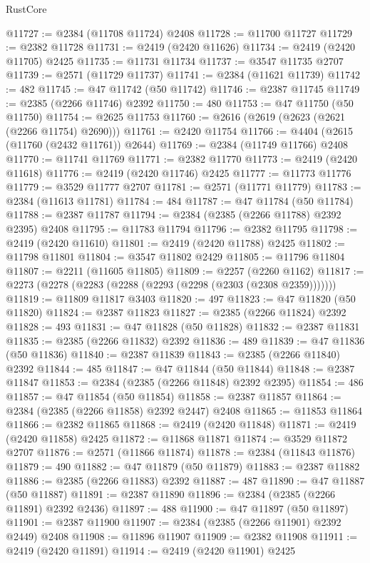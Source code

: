 \begin{lexlean}{RustCore}
\begin{coremodule}
@11727 := @2384 (@11708 @11724) @2408
@11728 := @11700 @11727
@11729 := @2382 @11728
@11731 := @2419 (@2420 @11626)
@11734 := @2419 (@2420 @11705) @2425
@11735 := @11731 @11734
@11737 := @3547 @11735 @2707
@11739 := @2571 (@11729 @11737)
@11741 := @2384 (@11621 @11739)
@11742 := 482
@11745 := @47 @11742 (@50 @11742)
@11746 := @2387 @11745
@11749 := @2385 (@2266 @11746) @2392
@11750 := 480
@11753 := @47 @11750 (@50 @11750)
@11754 := @2625 @11753
@11760 := @2616 (@2619 (@2623 (@2621 (@2266 @11754) @2690)))
@11761 := @2420 @11754
@11766 := @4404 (@2615 (@11760 (@2432 @11761)) @2644)
@11769 := @2384 (@11749 @11766) @2408
@11770 := @11741 @11769
@11771 := @2382 @11770
@11773 := @2419 (@2420 @11618)
@11776 := @2419 (@2420 @11746) @2425
@11777 := @11773 @11776
@11779 := @3529 @11777 @2707
@11781 := @2571 (@11771 @11779)
@11783 := @2384 (@11613 @11781)
@11784 := 484
@11787 := @47 @11784 (@50 @11784)
@11788 := @2387 @11787
@11794 := @2384 (@2385 (@2266 @11788) @2392 @2395) @2408
@11795 := @11783 @11794
@11796 := @2382 @11795
@11798 := @2419 (@2420 @11610)
@11801 := @2419 (@2420 @11788) @2425
@11802 := @11798 @11801
@11804 := @3547 @11802 @2429
@11805 := @11796 @11804
@11807 := @2211 (@11605 @11805)
@11809 := @2257 (@2260 @1162)
@11817 := @2273 (@2278 (@2283 (@2288 (@2293 (@2298 (@2303 (@2308 @2359)))))))
@11819 := @11809 @11817 @3403
@11820 := 497
@11823 := @47 @11820 (@50 @11820)
@11824 := @2387 @11823
@11827 := @2385 (@2266 @11824) @2392
@11828 := 493
@11831 := @47 @11828 (@50 @11828)
@11832 := @2387 @11831
@11835 := @2385 (@2266 @11832) @2392
@11836 := 489
@11839 := @47 @11836 (@50 @11836)
@11840 := @2387 @11839
@11843 := @2385 (@2266 @11840) @2392
@11844 := 485
@11847 := @47 @11844 (@50 @11844)
@11848 := @2387 @11847
@11853 := @2384 (@2385 (@2266 @11848) @2392 @2395)
@11854 := 486
@11857 := @47 @11854 (@50 @11854)
@11858 := @2387 @11857
@11864 := @2384 (@2385 (@2266 @11858) @2392 @2447) @2408
@11865 := @11853 @11864
@11866 := @2382 @11865
@11868 := @2419 (@2420 @11848)
@11871 := @2419 (@2420 @11858) @2425
@11872 := @11868 @11871
@11874 := @3529 @11872 @2707
@11876 := @2571 (@11866 @11874)
@11878 := @2384 (@11843 @11876)
@11879 := 490
@11882 := @47 @11879 (@50 @11879)
@11883 := @2387 @11882
@11886 := @2385 (@2266 @11883) @2392
@11887 := 487
@11890 := @47 @11887 (@50 @11887)
@11891 := @2387 @11890
@11896 := @2384 (@2385 (@2266 @11891) @2392 @2436)
@11897 := 488
@11900 := @47 @11897 (@50 @11897)
@11901 := @2387 @11900
@11907 := @2384 (@2385 (@2266 @11901) @2392 @2449) @2408
@11908 := @11896 @11907
@11909 := @2382 @11908
@11911 := @2419 (@2420 @11891)
@11914 := @2419 (@2420 @11901) @2425

\end{coremodule}
\end{lexlean}
